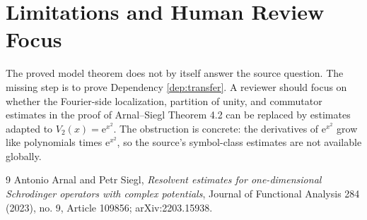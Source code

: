 \documentclass[11pt]{article}
\newcommand{\e}{\mathrm e}
\begin{document}
\section*{Limitations and Human Review Focus}

The proved model theorem does not by itself answer the source question.  The
missing step is to prove Dependency \ref{dep:transfer}.  A reviewer should
focus on whether the Fourier-side localization, partition of unity, and
commutator estimates in the proof of Arnal--Siegl Theorem 4.2 can be replaced
by estimates adapted to \(V_2(x)=\e^{x^2}\).  The obstruction is concrete:
the derivatives of \(\e^{x^2}\) grow like polynomials times \(\e^{x^2}\), so the
source's symbol-class estimates are not available globally.

\begin{thebibliography}{9}
Antonio Arnal and Petr Siegl,
\emph{Resolvent estimates for one-dimensional Schrodinger operators with
complex potentials},
Journal of Functional Analysis 284 (2023), no. 9, Article 109856;
arXiv:2203.15938.
\end{thebibliography}
\end{document}
